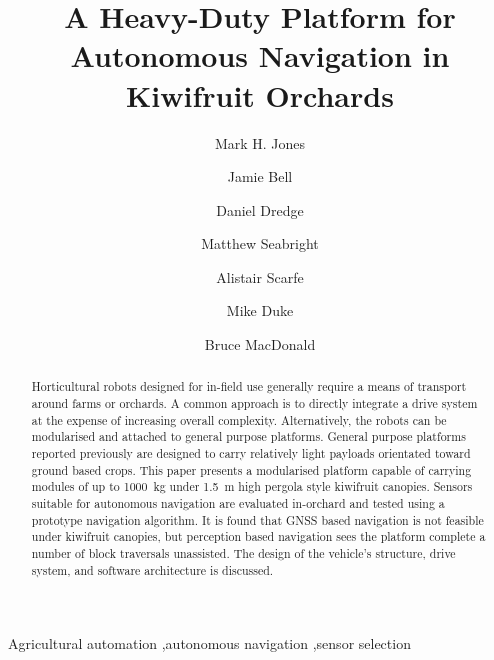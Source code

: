 \documentclass[preprint,authoryear,12pt]{elsarticle}
\begin{document}
\begin{frontmatter}

\title{A Heavy-Duty Platform for Autonomous Navigation in Kiwifruit Orchards}

\author[UoW]{Mark H. Jones}

\author[UoA]{Jamie Bell}
\author[UoW]{Daniel Dredge}
\author[UoW]{Matthew Seabright}
\author[RPL]{Alistair Scarfe}
\author[UoW]{Mike Duke}
\author[UoA]{Bruce MacDonald}

\address[UoW]{School of Engineering, University of Waikato, Hamilton, New Zealand}
\address[UoA]{Faculty of Engineering, University of Auckland, Auckland, New Zealand}
\address[RPL]{Robotics Plus Ltd, Newnham Innovation Park, Tauranga, New Zealand}

\begin{abstract}
    Horticultural robots designed for in-field use generally require a means of transport around farms or orchards.
    A common approach is to directly integrate a drive system at the expense of increasing overall complexity.
    Alternatively, the robots can be modularised and attached to general purpose platforms.
    General purpose platforms reported previously are designed to carry relatively light payloads orientated toward ground based crops.
    This paper presents a modularised platform capable of carrying modules of up to \SI{1000}{\kilo\gram} under \SI{1.5}{\meter} high pergola style kiwifruit canopies.
    Sensors suitable for autonomous navigation are evaluated in-orchard and tested using a prototype navigation algorithm.
    It is found that GNSS based navigation is not feasible under kiwifruit canopies, but perception based navigation sees the platform complete a number of block traversals unassisted.
    The design of the vehicle's structure, drive system, and software architecture is discussed.

\end{abstract}

\begin{keyword}
    Agricultural automation \sep autonomous navigation \sep sensor selection
\end{keyword}

\end{frontmatter}

\end{document}
